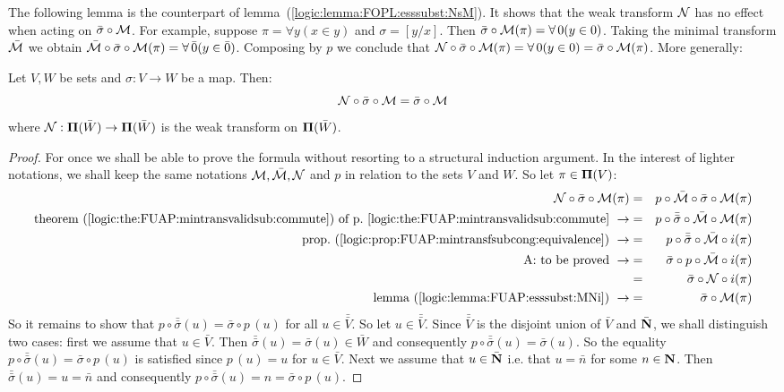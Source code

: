 The following lemma is the counterpart of
lemma~(\ref{logic:lemma:FOPL:esssubst:NsM}). It shows that the weak
transform ${\cal N}$ has no effect when acting on
$\bar{\sigma}\circ{\cal M}$. For example, suppose $\pi=\forall
y(x\in y)$ and $\sigma=[y/x]$. Then $\bar{\sigma}\circ{\cal
M}(\pi)=\forall\, 0(y\in 0)$. Taking the minimal transform
$\bar{\cal M}$ we obtain $\bar{\cal M}\circ\bar{\sigma}\circ{\cal
M}(\pi)=\forall\, \bar{0}(y\in \bar{0})$. Composing by $p$ we
conclude that ${\cal N}\circ\bar{\sigma}\circ{\cal M}(\pi)=\forall\,
0(y\in 0)=\bar{\sigma}\circ{\cal M}(\pi)$. More generally:

\begin{lemma}\label{logic:lemma:FUAP:esssubst:NsM}
Let $V,W$ be sets and $\sigma:V\to W$ be a map. Then:
    \[
    {\cal N}\circ\bar{\sigma}\circ{\cal M}=\bar{\sigma}\circ{\cal M}
    \]
where ${\cal N}:{\bf\Pi}(\bar{W})\to{\bf\Pi}(\bar{W})$ is the weak
transform on ${\bf\Pi}(\bar{W})$.
\end{lemma}
\begin{proof}
For once we shall be able to prove the formula without resorting to
a structural induction argument. In the interest of lighter
notations, we shall keep the same notations ${\cal M},\bar{\cal M},
{\cal N}$ and $p$ in relation to the sets $V$ and $W$. So let
$\pi\in\mbox{${\bf\Pi}(V)$}$:
    \begin{eqnarray*}
    {\cal N}\circ\bar{\sigma}\circ{\cal M}(\pi)&=&p\circ\bar{\cal
    M}\circ\bar{\sigma}\circ{\cal M}(\pi)\\
    \mbox{theorem~(\ref{logic:the:FUAP:mintransvalidsub:commute})
    of p.~\pageref{logic:the:FUAP:mintransvalidsub:commute}}\ \rightarrow
    &=&p\circ\bar{\bar{\sigma}}\circ\bar{\cal
    M}\circ{\cal M}(\pi)\\
    \mbox{prop.~(\ref{logic:prop:FUAP:mintransfsubcong:equivalence})}\ \rightarrow
    &=&p\circ\bar{\bar{\sigma}}\circ\bar{\cal
    M}\circ i(\pi)\\
    \mbox{A: to be proved}\ \rightarrow&=&\bar{\sigma}\circ p\circ\bar{\cal
    M}\circ i(\pi)\\
    &=&\bar{\sigma}\circ{\cal
    N}\circ i(\pi)\\
    \mbox{lemma~(\ref{logic:lemma:FUAP:esssubst:MNi})}\ \rightarrow
    &=&\bar{\sigma}\circ{\cal
    M}(\pi)\\
    \end{eqnarray*}
So it remains to show that
$p\circ\bar{\bar{\sigma}}(u)=\bar{\sigma}\circ p\,(u)$ for all
$u\in\bar{\bar{V}}$. So let $u\in\bar{\bar{V}}$. Since
$\bar{\bar{V}}$ is the disjoint union of $\bar{V}$ and $\bar{\mbox{$\bf N$}}$,
we shall distinguish two cases: first we assume that $u\in\bar{V}$.
Then $\bar{\bar{\sigma}}(u)=\bar{\sigma}(u)\in\bar{W}$ and
consequently $p\circ\bar{\bar{\sigma}}(u)=\bar{\sigma}(u)$. So the
equality $p\circ\bar{\bar{\sigma}}(u)=\bar{\sigma}\circ p\,(u)$ is
satisfied since $p\,(u)=u$ for $u\in\bar{V}$. Next we assume that
$u\in\bar{\mbox{$\bf N$}}$ i.e. that $u=\bar{n}$ for some $n\in\mbox{$\bf N$}$. Then
$\bar{\bar{\sigma}}(u)=u=\bar{n}$ and consequently
$p\circ\bar{\bar{\sigma}}(u)=n=\bar{\sigma}\circ p\,(u)$.
\end{proof}

